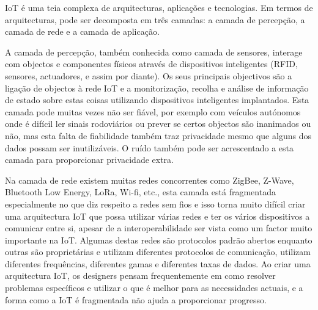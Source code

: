 \documentclass[conference]{IEEEtran}
\begin{document}
IoT é uma teia complexa de arquitecturas, aplicações e tecnologias. Em termos
de arquitecturas, pode ser decomposta em três camadas: a camada de percepção,
a camada de rede e a camada de aplicação.


A camada de percepção, também conhecida como camada de sensores, interage
com objectos e componentes físicos através de dispositivos inteligentes
(RFID, sensores, actuadores, e assim por diante). Os seus principais objectivos
são a ligação de objectos à rede IoT e a monitorização, recolha e análise de
informação de estado sobre estas coisas utilizando dispositivos inteligentes
implantados. Esta camada pode muitas vezes não ser fiável, por exemplo com
veículos autónomos onde é difícil ler sinais rodoviários ou prever se certos
objectos são inanimados ou não, mas esta falta de fiabilidade também traz
privacidade mesmo que alguns dos dados possam ser inutilizáveis. O ruído
também pode ser acrescentado a esta camada para proporcionar privacidade
extra.


Na camada de rede existem muitas redes concorrentes como ZigBee, Z-Wave,
Bluetooth Low Energy, LoRa, Wi-fi, etc., esta camada está fragmentada
especialmente no que diz respeito a redes sem fios e isso torna muito
difícil criar uma arquitectura IoT que possa utilizar várias redes e
ter os vários dispositivos a comunicar entre si, apesar de a interoperabilidade
ser vista como um factor muito importante na IoT. Algumas destas redes
são protocolos padrão abertos enquanto outras são proprietárias e utilizam
diferentes protocolos de comunicação, utilizam diferentes frequências,
diferentes gamas e diferentes taxas de dados. Ao criar uma arquitectura
IoT, os designers pensam frequentemente em como resolver problemas específicos
e utilizar o que é melhor para as necessidades actuais, e a forma como a
IoT é fragmentada não ajuda a proporcionar progresso.
\end{document}
